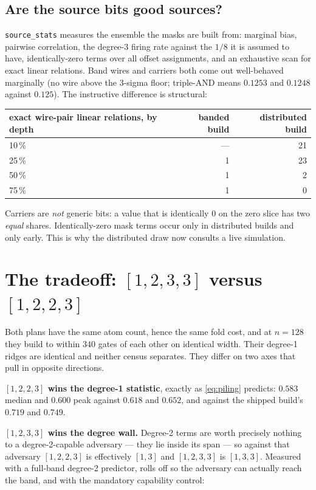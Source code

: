 \documentclass[11pt]{article}
\newcommand{\code}[1]{\texttt{#1}}
\begin{document}
\subsection{Are the source bits good sources?}

\code{source\_stats} measures the ensemble the masks are built from: marginal
bias, pairwise correlation, the degree-3 firing rate against the $1/8$ it is
assumed to have, identically-zero terms over all offset assignments, and an
exhaustive scan for exact linear relations. Band wires and carriers both come
out well-behaved marginally (no wire above the 3-sigma floor; triple-AND means
$0.1253$ and $0.1248$ against $0.125$). The instructive difference is
structural:

\begin{center}
\begin{tabular}{lrr}
\toprule
exact wire-pair linear relations, by depth & banded build & distributed build \\
\midrule
10\,\% & --- & 21 \\
25\,\% & 1 & 23 \\
50\,\% & 1 & 2 \\
75\,\% & 1 & 0 \\
\bottomrule
\end{tabular}
\end{center}

Carriers are \emph{not} generic bits: a value that is identically $0$ on the
zero slice has two \emph{equal} shares. Identically-zero mask terms occur only
in distributed builds and only early. This is why the distributed draw now
consults a live simulation.

\section{The tradeoff: $[1,2,3,3]$ versus $[1,2,2,3]$}
\label{sec:tradeoff}

Both plans have the same atom count, hence the same fold cost, and at $n{=}128$
they build to within $340$ gates of each other on identical width. Their
degree-1 ridges are identical and neither census separates. They differ on two
axes that pull in opposite directions.

\textbf{$[1,2,2,3]$ wins the degree-1 statistic}, exactly as \eqref{eq:piling}
predicts: $0.583$ median and $0.600$ peak against $0.618$ and $0.652$, and
against the shipped build's $0.719$ and $0.749$.

\textbf{$[1,2,3,3]$ wins the degree wall.} Degree-2 terms are worth precisely
nothing to a degree-2-capable adversary --- they lie inside its span --- so
against that adversary $[1,2,2,3]$ is effectively $[1,3]$ and $[1,2,3,3]$ is
$[1,3,3]$. Measured with a full-band degree-2 predictor, rolls off so the
adversary can actually reach the band, and with the mandatory capability
control:
\end{document}
